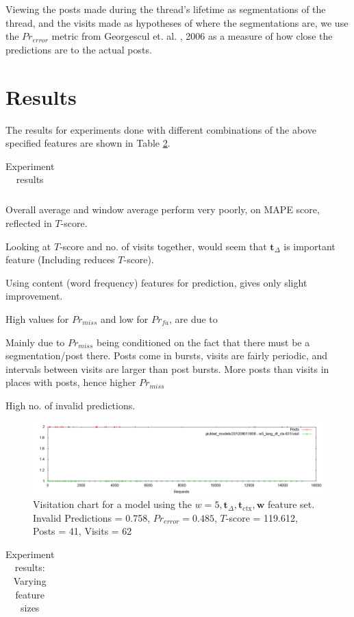 \documentclass[12 pt]{article}
\begin{document}
Viewing the posts made during the thread's lifetime as segmentations of the thread, and the visits made as hypotheses of where the segmentations are, we use the $Pr_{error}$ metric from Georgescul et. al. , 2006 as a measure of how close the predictions are to the actual posts.





\section{Results}

The results for experiments done with different combinations of the above specified features are shown in Table \ref{expt1}.
\begin{table}
	\footnotesize
	\begin{centering}
	\begin{tabular}{|l|c|c|c|c|c|c|c|c|}
	\hline
	
	\hline
	\end{tabular}
	\caption{Experiment results}
	\label{expt1}
\end{centering}
\end{table}

Overall average and window average perform very poorly, on MAPE score, reflected in $T$-score.

Looking at $T$-score and no. of visits together, would seem that $\textbf{t}_\Delta$ is important feature (Including reduces $T$-score).

Using content (word frequency) features for prediction, gives only slight improvement.

High values for $Pr_{miss}$ and low for $Pr_{fa}$, are due to

	Mainly due to $Pr_{miss}$ being conditioned on the fact that there must be a segmentation/post there.
	Posts come in bursts, visits are fairly periodic, and intervals between visits are larger than post bursts.
	More posts than visits in places with posts, hence higher $Pr_{miss}$

	High no. of invalid predictions.
\begin{landscape}
\begin{figure}
	\centering
	\includegraphics[scale=0.5]{example_seq.png}
	\caption{Visitation chart for a model using the $w=5, \mathbf{t}_\Delta, \mathbf{t}_{\text{ctx}},\mathbf{w}$ feature set. Invalid Predictions = 0.758, $Pr_{error} =  0.485$, $T$-score = 119.612, Posts = 41, Visits = 62}
\end{figure}
\end{landscape}

\begin{table}
	\footnotesize
	\begin{centering}
	\begin{tabular}{|l|c|c|c|c|c|c|c|c|}
	\hline
	
	\hline
	\end{tabular}
	\caption{Experiment results: Varying feature sizes}
	\label{expt1}
\end{centering}
\end{table}




\end{document}
